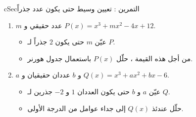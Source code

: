 \documentclass[12pt,a4paper]{article}
\newenvironment{BOX}[2]{\begin{otherlanguage}{english}\begin{arbox}{#1}{#2}}{\end{arbox}\end{otherlanguage}}
\newcounter{exo}
\newenvironment{tamrin}[1]{\stepcounter{exo}\begin{BOX}{cSec}{التمرين \theexo: #1}}{\end{BOX}}
\begin{document}
\begin{tamrin}{تعيين وسيط حتى يكون عدد جذراً}
\begin{enumerate}
\item $m$ عدد حقيقي و $P(x)=x^3+mx^2-4x+12$.
\begin{itemize}
\item[(أ)] عيّن $m$ حتى يكون $2$ جذراً لـ $P$.
\item[(ب)] من أجل هذه القيمة ، حلّل $P(x)$ باستعمال جدول هورنر.
\end{itemize}
\item $a$ و $b$ عددان حقيقيان و $Q(x)=x^3+ax^2+bx-6$.
\begin{itemize}
\item[(أ)] عيّن $a$ و $b$ حتى يكون العددان $1$ و $-2$ جذرين لـ $Q$.
\item[(ب)] حلّل عندئذ $Q(x)$ إلى جداء عوامل من الدرجة الأولى.
\end{itemize}
\end{enumerate}
\end{tamrin}
\end{document}
